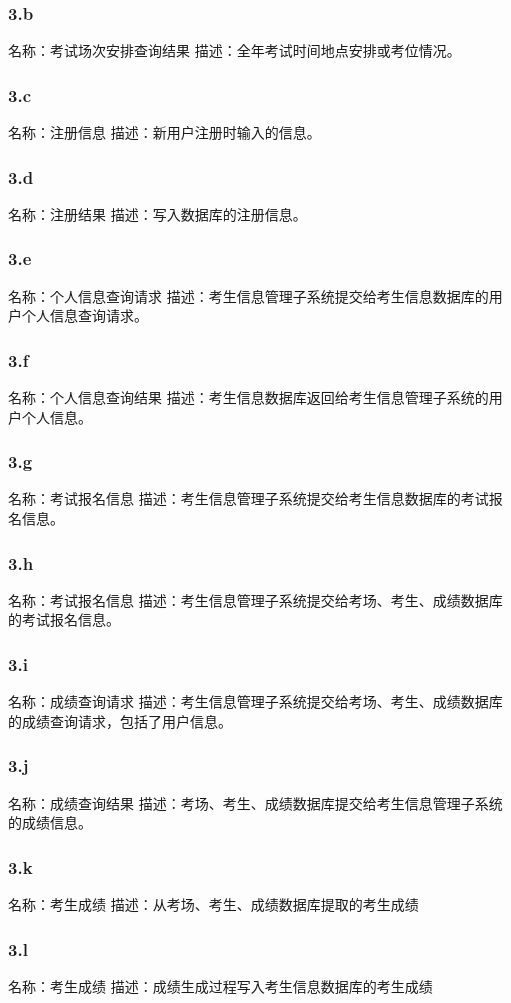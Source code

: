 \subsubsection{3.b}
名称：考试场次安排查询结果
描述：全年考试时间地点安排或考位情况。
\subsubsection{3.c}
名称：注册信息
描述：新用户注册时输入的信息。
\subsubsection{3.d}
名称：注册结果
描述：写入数据库的注册信息。
\subsubsection{3.e}
名称：个人信息查询请求
描述：考生信息管理子系统提交给考生信息数据库的用户个人信息查询请求。
\subsubsection{3.f}
名称：个人信息查询结果
描述：考生信息数据库返回给考生信息管理子系统的用户个人信息。
\subsubsection{3.g}
名称：考试报名信息
描述：考生信息管理子系统提交给考生信息数据库的考试报名信息。
\subsubsection{3.h}
名称：考试报名信息
描述：考生信息管理子系统提交给考场、考生、成绩数据库的考试报名信息。
\subsubsection{3.i}
名称：成绩查询请求
描述：考生信息管理子系统提交给考场、考生、成绩数据库的成绩查询请求，包括了用户信息。
\subsubsection{3.j}
名称：成绩查询结果
描述：考场、考生、成绩数据库提交给考生信息管理子系统的成绩信息。
\subsubsection{3.k}
名称：考生成绩
描述：从考场、考生、成绩数据库提取的考生成绩
\subsubsection{3.l}
名称：考生成绩
描述：成绩生成过程写入考生信息数据库的考生成绩
